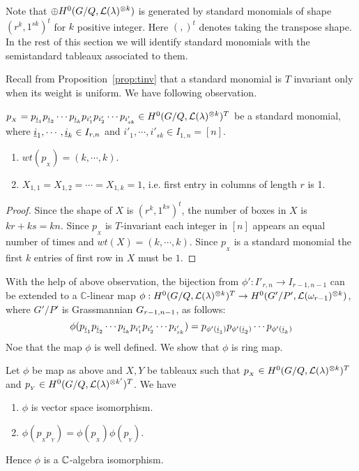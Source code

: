 Note that \(\oplus H^0(G/Q,{\cal L}(\lambda)^{\otimes k})\) is generated by standard monomials of shape \((r^k,1^{sk})^t\) for \(k\) positive integer. Here $(,)^t$ denotes taking the transpose shape.  In the rest of this section we will identify standard monomials with the semistandard tableaux associated to them.

Recall from Proposition~\ref{prop:tinv} that a standard monomial is $T$ invariant only when its weight is uniform. We have following observation.

\begin{observation}
    \(p_{_X} = p_{{\underline i}_1}p_{{\underline i}_2}\cdots p_{{\underline i}_k} p_{i'_1}p_{i'_2}\cdots p_{i'_{sk}} \in H^0(G/Q,{\cal L}(\lambda)^{\otimes k})^T\) be a standard monomial, where \({\underline i}_1,\cdots,{\underline i}_k \in I_{r,n}\) and \(i'_1,\cdots, i'_{sk} \in I_{1,n} = [n]\).
\begin{enumerate}
    \item \(wt(p_{_X}) = (k,\cdots,k)\).
    \item \(X_{1,1} = X_{1,2} = \cdots = X_{1,k} = 1\), i.e. first entry in columns of length \(r\) is 1.
\end{enumerate}
\end{observation}
\begin{proof}
    Since the shape of \(X\) is \((r^k,1^{ks})^t\), the number of boxes in \(X\) is \(kr+ks=kn\). Since \(p_{_X}\) is \(T\)-invariant each integer in \([n]\) appears an equal number of times and \(wt(X) = (k,\cdots,k)\). Since \(p_{_X}\) is a standard monomial the first \(k\) entries of first row in $X$ must be \(1\).
\end{proof}
With the help of above observation, the bijection from \(\phi':I'_{r,n}\to I_{r-1,n-1}\) can be extended to a ${\mathbb C}$-linear map \(\phi:H^0(G/Q,{\cal L}(\lambda)^{\otimes k})^T \to H^0(G'/P',{\cal L}(\omega_{r-1})^{\otimes k})\), where \(G'/P'\) is Grassmannian \(G_{{r-1},{n-1}}\), as follows:
    \[\phi(p_{{\underline i}_1}p_{{\underline i}_2}\cdots p_{{\underline i}_k} p_{i'_1}p_{i'_2}\cdots p_{i'_{sk}})
    = p_{\phi'({\underline i}_1)}p_{\phi'({\underline i}_2)}\cdots p_{\phi'({\underline i}_k)}\] 
Noe that the map \(\phi\) is well defined. We show that \(\phi\) is ring map.
\begin{lemma}
    Let \(\phi\) be map as above and \(X,Y\) be tableaux such that
    \(p_{_X} \in H^0(G/Q,{\cal L}(\lambda)^{\otimes k})^T\) 
    and \(p_{_Y} \in H^0(G/Q,{\cal L}(\lambda)^{\otimes k'})^T\). 
    We have
    \begin{enumerate}
        \item \(\phi\) is vector space isomorphism.
        \item \(\phi(p_{_X}p_{_Y}) = \phi(p_{_X})\phi(p_{_Y})\).
    \end{enumerate}
    Hence \(\phi\) is a \(\mathbb{C}\)-algebra isomorphism.
\end{lemma}
